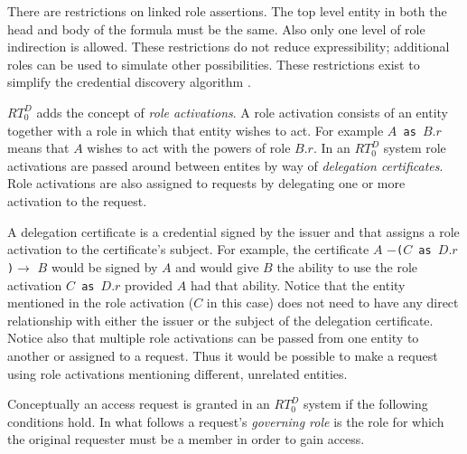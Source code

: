 \documentclass{article}
\newcommand{\newterm}[1]{\textit{#1}}
\newcommand{\delcert}[3]{\texttt{#1} $-$\texttt{(#2)}$\rightarrow$ \texttt{#3}}
\newcommand{\activate}[2]{\texttt{#1 as #2}}
\begin{document}
There are restrictions on linked role assertions. The top level entity in both the head and body
of the formula must be the same. Also only one level of role indirection is allowed. These
restrictions do not reduce expressibility; additional roles can be used to simulate other
possibilities. These restrictions exist to simplify the credential discovery algorithm
\cite{Li:2003-02}.


$RT_0^D$ adds the concept of \newterm{role activations}. A role activation consists of an entity
together with a role in which that entity wishes to act. For example \activate{$A$}{$B.r$} means
that $A$ wishes to act with the powers of role $B.r$. In an $RT_0^D$ system role activations are
passed around between entites by way of \newterm{delegation certificates}. Role activations are
also assigned to requests by delegating one or more activation to the request.

A delegation certificate is a credential signed by the issuer and that assigns a role activation
to the certificate's subject. For example, the certificate
\delcert{$A$}{\activate{$C$}{$D.r$}}{$B$} would be signed by $A$ and would give $B$ the ability
to use the role activation \activate{$C$}{$D.r$} provided $A$ had that ability. Notice that the
entity mentioned in the role activation ($C$ in this case) does not need to have any direct
relationship with either the issuer or the subject of the delegation certificate. Notice also
that multiple role activations can be passed from one entity to another or assigned to a
request. Thus it would be possible to make a request using role activations mentioning
different, unrelated entities.

Conceptually an access request is granted in an $RT_0^D$ system if the following conditions
hold. In what follows a request's \newterm{governing role} is the role for which the original
requester must be a member in order to gain access.
\end{document}
